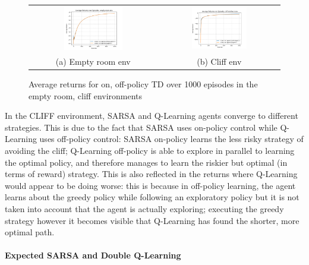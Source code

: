 \documentclass[12pt]{article}
\begin{document}
\begin{figure}[!h]
	\centering
	\begin{tabular}{cc}
		\includegraphics[width=0.48\textwidth]{figures/on-off-policy-empty-room.png} &
		\includegraphics[width=0.48\textwidth]{figures/on-off-policy-cliff.png}                      \\
		(a) Empty room env                                                           & (b) Cliff env
	\end{tabular}
	\caption{Average returns for on, off-policy TD over 1000 episodes in the empty room, cliff environments}
	\label{fig:on-off-policy}
\end{figure}

In the CLIFF environment, SARSA and Q-Learning agents converge to different strategies.
This is due to the fact that SARSA uses on-policy control while Q-Learning uses off-policy control:
SARSA on-policy learns the less risky strategy of avoiding the cliff;
Q-Learning off-policy is able to explore in parallel to learning the optimal policy,
and therefore manages to learn the riskier but optimal (in terms of reward) strategy.
This is also reflected in the returns where Q-Learning would appear to be doing worse:
this is because in off-policy learning, the agent learns about the greedy policy while following an exploratory policy but it is not taken into account that the agent is actually exploring; executing the greedy strategy however it becomes visible that Q-Learning has found the shorter, more optimal path.

\paragraph{Expected SARSA and Double Q-Learning}
\end{document}
